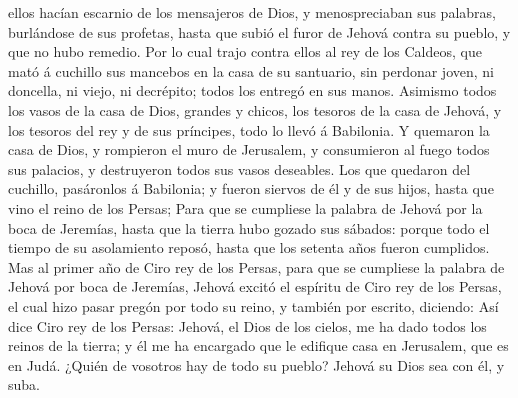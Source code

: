 ellos hacían escarnio de los mensajeros de Dios, y menospreciaban sus
palabras, burlándose de sus profetas, hasta que subió el furor de Jehová
contra su pueblo, y que no hubo remedio.  Por lo cual
trajo contra ellos al rey de los Caldeos, que mató á cuchillo sus
mancebos en la casa de su santuario, sin perdonar joven, ni doncella, ni
viejo, ni decrépito; todos los entregó en sus manos. 
Asimismo todos los vasos de la casa de Dios, grandes y chicos, los
tesoros de la casa de Jehová, y los tesoros del rey y de sus príncipes,
todo lo llevó á Babilonia.  Y quemaron la casa de Dios, y
rompieron el muro de Jerusalem, y consumieron al fuego todos sus
palacios, y destruyeron todos sus vasos deseables.  Los
que quedaron del cuchillo, pasáronlos á Babilonia; y fueron siervos de
él y de sus hijos, hasta que vino el reino de los Persas;
 Para que se cumpliese la palabra de Jehová por la boca
de Jeremías, hasta que la tierra hubo gozado sus sábados: porque todo el
tiempo de su asolamiento reposó, hasta que los setenta años fueron
cumplidos.  Mas al primer año de Ciro rey de los Persas,
para que se cumpliese la palabra de Jehová por boca de Jeremías, Jehová
excitó el espíritu de Ciro rey de los Persas, el cual hizo pasar pregón
por todo su reino, y también por escrito, diciendo:  Así
dice Ciro rey de los Persas: Jehová, el Dios de los cielos, me ha dado
todos los reinos de la tierra; y él me ha encargado que le edifique casa
en Jerusalem, que es en Judá. ¿Quién de vosotros hay de todo su pueblo?
Jehová su Dios sea con él, y suba.

